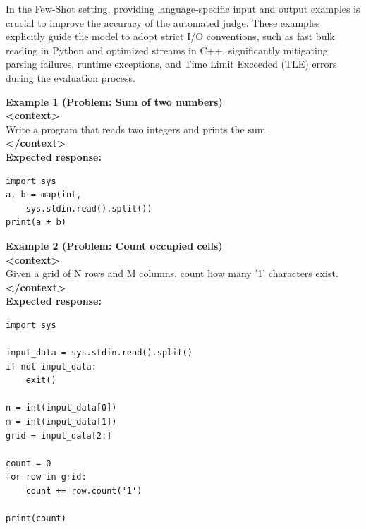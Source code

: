 \documentclass[conference]{IEEEtran}
\begin{document}
In the Few-Shot setting, providing language-specific input and output examples is crucial to improve the accuracy of the automated judge. These examples explicitly guide the model to adopt strict I/O conventions, such as fast bulk reading in Python and optimized streams in C++, significantly mitigating parsing failures, runtime exceptions, and Time Limit Exceeded (TLE) errors during the evaluation process.

\begin{tcolorbox}[breakable, colframe=black!75, colback=black!5, title=\textbf{Python I/O Examples}]
\textbf{Example 1 (Problem: Sum of two numbers)}\\
\textbf{\textless{}context\textgreater{}}\\
Write a program that reads two integers and prints the sum.\\
\textbf{\textless{}/context\textgreater{}}\\
\textbf{Expected response:}
\begin{verbatim}
import sys
a, b = map(int,
    sys.stdin.read().split())
print(a + b)
\end{verbatim}

\vspace{0.3cm}
\textbf{Example 2 (Problem: Count occupied cells)}\\
\textbf{\textless{}context\textgreater{}}\\
Given a grid of N rows and M columns, count how many '1' characters exist.\\
\textbf{\textless{}/context\textgreater{}}\\
\textbf{Expected response:}
\begin{verbatim}
import sys

input_data = sys.stdin.read().split()
if not input_data:
    exit()

n = int(input_data[0])
m = int(input_data[1])
grid = input_data[2:]

count = 0
for row in grid:
    count += row.count('1')

print(count)
\end{verbatim}
\end{tcolorbox}



\end{document}
